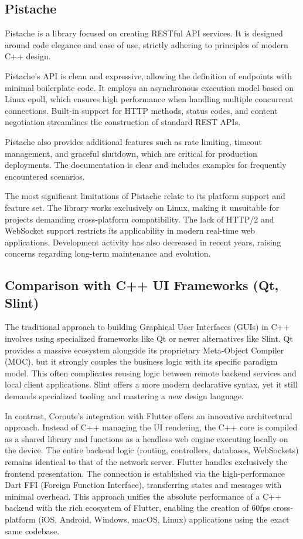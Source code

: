 \subsection{Pistache}

Pistache \cite{pistache} is a library focused on creating RESTful API services. It is designed around code elegance and ease of use, strictly adhering to principles of modern C++ design.

Pistache's API is clean and expressive, allowing the definition of endpoints with minimal boilerplate code. It employs an asynchronous execution model based on Linux epoll, which ensures high performance when handling multiple concurrent connections. Built-in support for HTTP methods, status codes, and content negotiation streamlines the construction of standard REST APIs.

Pistache also provides additional features such as rate limiting, timeout management, and graceful shutdown, which are critical for production deployments. The documentation is clear and includes examples for frequently encountered scenarios.

The most significant limitations of Pistache relate to its platform support and feature set. The library works exclusively on Linux, making it unsuitable for projects demanding cross-platform compatibility. The lack of HTTP/2 and WebSocket support restricts its applicability in modern real-time web applications. Development activity has also decreased in recent years, raising concerns regarding long-term maintenance and evolution.

\subsection{Comparison with C++ UI Frameworks (Qt, Slint)}

The traditional approach to building Graphical User Interfaces (GUIs) in C++ involves using specialized frameworks like Qt or newer alternatives like Slint. Qt provides a massive ecosystem alongside its proprietary Meta-Object Compiler (MOC), but it strongly couples the business logic with its specific paradigm model. This often complicates reusing logic between remote backend services and local client applications. Slint offers a more modern declarative syntax, yet it still demands specialized tooling and mastering a new design language.

In contrast, Coroute's integration with Flutter offers an innovative architectural approach. Instead of C++ managing the UI rendering, the C++ core is compiled as a shared library and functions as a headless web engine executing locally on the device. The entire backend logic (routing, controllers, databases, WebSockets) remains identical to that of the network server. Flutter handles exclusively the frontend presentation. The connection is established via the high-performance Dart FFI (Foreign Function Interface), transferring states and messages with minimal overhead. This approach unifies the absolute performance of a C++ backend with the rich ecosystem of Flutter, enabling the creation of 60fps cross-platform (iOS, Android, Windows, macOS, Linux) applications using the exact same codebase.

